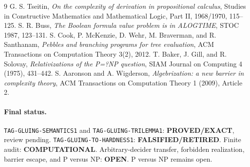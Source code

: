 \documentclass[11pt]{article}
\newcommand{\EXACT}{\textbf{PROVED/EXACT}}
\newcommand{\COMP}{\textbf{COMPUTATIONAL}}
\newcommand{\OPEN}{\textbf{OPEN}}
\newcommand{\RETIRED}{\textbf{FALSIFIED/RETIRED}}
\begin{document}
\begin{thebibliography}{9}
 G. S. Tseitin, \emph{On the complexity of derivation in
propositional calculus}, Studies in Constructive Mathematics and Mathematical
Logic, Part II, 1968/1970, 115--125.
 S. R. Buss, \emph{The Boolean formula value problem is in
ALOGTIME}, STOC 1987, 123--131.
 S. Cook, P. McKenzie, D. Wehr, M. Braverman, and
R. Santhanam, \emph{Pebbles and branching programs for tree evaluation},
ACM Transactions on Computation Theory 3(2), 2012.
 T. Baker, J. Gill, and R. Solovay, \emph{Relativizations of the
P=?NP question}, SIAM Journal on Computing 4 (1975), 431--442.
 S. Aaronson and A. Wigderson, \emph{Algebrization: a new barrier
in complexity theory}, ACM Transactions on Computation Theory 1 (2009),
Article 2.
\end{thebibliography}

\paragraph{Final status.}
\texttt{TAG-GLUING-SEMANTICS1} and \texttt{TAG-GLUING-TRILEMMA1}: \EXACT,
review pending.  \texttt{TAG-GLUING-TO-HARDNESS1}: \RETIRED.  Finite audit:
\COMP.  Arbitrary-decider transfer, forbidden realization, barrier escape,
and P versus NP: \OPEN.  P versus NP remains open.
\end{document}
